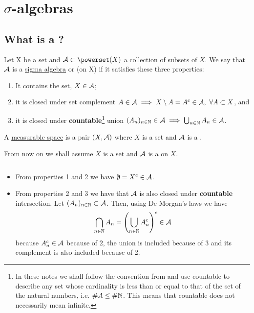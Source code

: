 
\chapter{$\sigma$-algebras}

\section{What is a \siga?}

\begin{dfn}
	Let X be a set and $\sa \subset \powerset(X)$ a collection of subsets of $X$. We say that $\mathcal{A}$ is a \underline{sigma algebra} or \siga (on X) if it satisfies these three properties:
	\begin{enumerate}
		\item It contains the set, $X \in \mathcal{A}$;
		\item it is closed under set complement $A \in \mathcal{A} \implies X \setminus A = A^c \in \mathcal{A},\ \forall A \subset X$, and
		\item it is closed under \textbf{countable}\footnote{In these notes we shall follow the convention from \cite[bottom of p. 7]{schilling2017} and use countable to describe any set whose cardinality is less than or equal to that of the set of the natural numbers, i.e. $\# A \leq \# \mathbb{N}$. This means that countable does not necessarily mean infinite.} union $(A_n)_{n \in \mathbb{N}} \in \mathcal{A} \implies \bigcup_{n \in \mathbb{N}} A_n \in \mathcal{A}$.
	\end{enumerate}
\end{dfn}

\begin{dfn}
	A \underline{measurable space} is a pair $(X, \mathcal{A})$ where $X$ is a set and $\mathcal{A}$ is a \siga.
\end{dfn}

From now on we shall assume $X$ is a set and $\mathcal{A}$ is a \siga on $X$.

\begin{remark}$ $ \newline
	\begin{itemize}
		\item From properties 1 and 2 we have $\emptyset = X^c\in \mathcal{A}$.
		\item From properties 2 and 3 we have that $\mathcal{A}$ is also closed under \textbf{countable} intersection. Let $(A_n)_{n \in \mathbb{N}} \subset \mathcal{A}$. Then, using De Morgan's laws we have
		\begin{align*}
			\bigcap_{n \in \mathbb{N}} A_n = \left(\bigcup_{n \in \mathbb{N}} A_n^c\right)^c \in \mathcal{A}
		\end{align*}
		because $A_n^c \in \mathcal{A}$ because of 2, the union is included because of 3 and its complement is also included because of 2.
	\end{itemize}
\end{remark}

